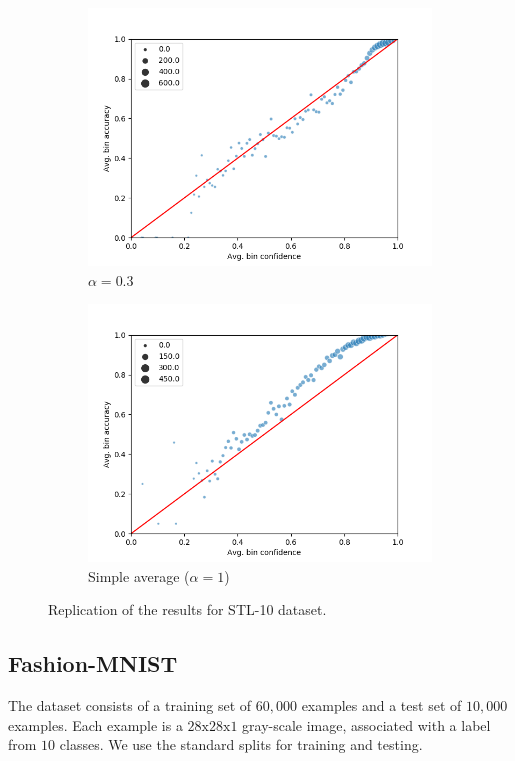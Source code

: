 \begin{figure}[h]
\begin{subfigure}[b]{0.31\textwidth}
         \centering
         \noindent\includegraphics[width=\textwidth]{images/stl10/scatterplot_0-3.png}
         \caption{$\alpha=0.3$}
     \end{subfigure}
     \begin{subfigure}[b]{0.31\textwidth}
         \centering
         \noindent\includegraphics[width=\textwidth]{images/stl10/scatterplot_1.png}
         \caption{Simple average ($\alpha=1$)}
     \end{subfigure}
        \caption{Replication of the results for STL-10 dataset.}
        \label{fig:stl_10}
\end{figure}

\subsection{Fashion-MNIST}
The dataset consists of a training set of $60,000$ examples and a test set of $10,000$ examples. Each example is a $28\text{x}28\text{x}1$ gray-scale image, associated with a label from $10$ classes. We use the standard splits for training and testing. 


